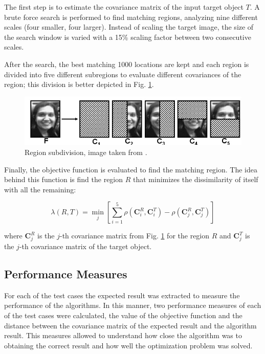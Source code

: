 \documentclass[11pt]{article}
\theoremstyle{definition}
\theoremstyle{remark}
\theoremstyle{remark}
\theoremstyle{remark}
\begin{document}
The first step is to estimate the covariance matrix of the input target object
$T$. A brute force search is performed to find matching regions, analyzing nine
different scales (four smaller, four larger). Instead of scaling the target
image, the size of the search window is varied with a 15\% scaling factor
between two consecutive scales.

After the search, the best matching 1000 locations are kept and each region is
divided into five different subregions to evaluate different covariances of the
region; this division is better depicted in Fig. \ref{fig:regions}.

\begin{figure}[H]
  \centering \includegraphics[scale=.6]{figs/regions.png}
  \caption{Region subdivision, image taken from \parencite{tuzel2006}.}
  \label{fig:regions}
\end{figure}

Finally, the objective function is evaluated to find the matching region. The
idea behind this function is find the region $R$ that minimizes the
dissimilarity of itself with all the remaining:

\begin{equation*}
  \lambda(R, T)=\min _{j}\left[\sum_{i=1}^{5} \rho\left(\mathbf{C}_{i}^{R}, \mathbf{C}_{i}^{T}\right)-\rho\left(\mathbf{C}_{j}^{R}, \mathbf{C}_{j}^{T}\right)\right]
\end{equation*}

where $\mathbf{C}_j^R$ is the $j$-th covariance matrix from Fig.
\ref{fig:regions} for the region $R$ and $\mathbf{C}_j^T$ is the $j$-th
covariance matrix of the target object.

\subsection{Performance Measures}
For each of the test cases the expected result was extracted to measure the
performance of the algorithms. In this manner, two performance measures of each
of the test cases were calculated, the value of the objective function and the
distance between the covariance matrix of the expected result and the algorithm
result. This measures allowed to understand how close the algorithm was to
obtaining the correct result and how well the optimization problem was solved.
\end{document}
